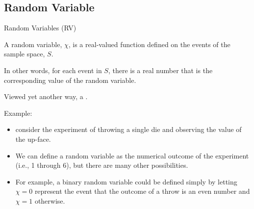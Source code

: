 \subsection{Random Variable}
%
%
\begin{slide}{Random Variables (RV)}
\begin{titlelist}{}{}
\small
\item<2-> A random variable, $\chi$, is a real-valued function defined on the events of the sample space, $S$.  

\item<3-> In other words, for each event in $S$, there is a real number that is the corresponding value of the random variable.  

\item<4-> Viewed yet another way, a . 

\item<5-> Example:
\begin{itemize}

\item<6-> 
consider the experiment of throwing a single die and observing the value of the up-face.  

\item<7-> 
We can define a random variable as the numerical outcome of the experiment (i.e., 1 through 6), but there are many other possibilities.  

\item<8-> 
For example, a binary random variable could be defined simply by letting $\chi = 0$ represent the event that the outcome of a throw is an even number and $\chi=1$ otherwise.

\end{itemize}

\end{titlelist}

\end{slide}

